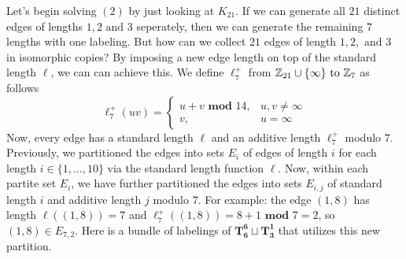   Let's begin solving $(2)$ by just looking at $K_{21}$. If we can generate all $21$ distinct edges of lengths $1,2\text{ and }3$ seperately, then we can generate the remaining $7$ lengths with one labeling. But how can we collect $21$ edges of length $1,2,\text{ and }3$ in isomorphic copies? By imposing a new edge length on top of the standard length $\ell$, we can can achieve this. We define $\ell_{7}^{+}$ from $\mathbb{Z}_{21}\cup\{\infty\}\text{ to }\mathbb{Z}_{7}$ as follows
  $$\ell_{7}^{+}(uv)=\begin{cases} u+v\textbf{ mod }14, & u,v\neq \infty\\ v, &u=\infty \end{cases}$$
  Now, every edge has a standard length $\ell$ and an additive length $\ell_{7}^{+}$ modulo $7$. Previously, we partitioned the edges into sets $E_{i}$ of edges of length $i$ for each length $i\in \{1,\hdots, 10\}$ via the standard length function $\ell$. Now, within each partite set $E_{i}$, we have further partitioned the edges into sets $E_{i,j}$ of standard length $i$ and additive length $j$ modulo $7$. For example: the edge $(1,8)$ has length $\ell((1,8))=7$ and $\ell_{7}^{+}((1,8))=8+1 \textbf{ mod }7=2$, so $(1,8)\in E_{7,2}$. Here is a bundle of labelings of $\mathbf{T_{6}^{6}}\sqcup \mathbf{T_{3}^{1}}$ that utilizes this new partition.

